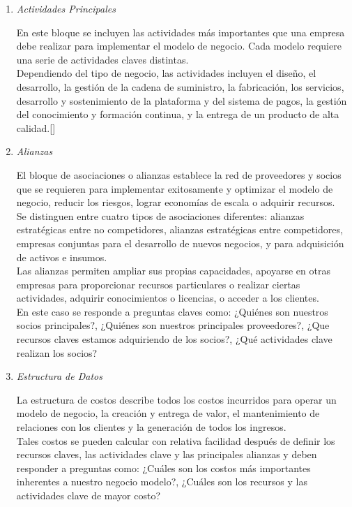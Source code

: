 \documentclass[10pt,a4paper]{article}
\begin{document}
\begin{multicols}{2}
\begin{enumerate}[1.]
			\item \textit{Actividades Principales}
			
			En este bloque se incluyen las actividades más importantes que una empresa debe realizar para implementar el modelo de negocio. Cada modelo requiere una serie de actividades claves distintas.\\
			
			Dependiendo del tipo de negocio, las actividades incluyen el diseño, el desarrollo, la gestión de la cadena de suministro, la fabricación, los servicios, desarrollo y sostenimiento de la plataforma y del sistema de pagos, la gestión del conocimiento y formación continua, y la entrega de un producto de alta calidad.[]
			
			\item \textit{Alianzas}
			
			El bloque de asociaciones o alianzas establece la red de proveedores y socios que se requieren para implementar exitosamente y optimizar el modelo de negocio, reducir los riesgos, lograr economías de escala o adquirir recursos.\\
			
			Se distinguen entre cuatro tipos de asociaciones diferentes: alianzas estratégicas entre no competidores, alianzas estratégicas entre competidores, empresas conjuntas para el desarrollo de nuevos negocios, y para adquisición de activos e insumos.\\
			
			Las alianzas permiten ampliar sus propias capacidades, apoyarse en otras empresas para proporcionar recursos particulares o realizar ciertas actividades, adquirir conocimientos o licencias, o acceder a los clientes.\\
			
			En este caso se responde a preguntas claves como: ¿Quiénes son nuestros socios principales?, ¿Quiénes son nuestros principales proveedores?, ¿Que recursos claves estamos adquiriendo de los socios?, ¿Qué actividades clave realizan los socios?
			
			\item \textit{Estructura de Datos}
			
			La estructura de costos describe todos los costos incurridos para operar un modelo de negocio, la creación y entrega de valor, el mantenimiento de relaciones con los clientes y la generación de todos los ingresos.\\
			
			Tales costos se pueden calcular con relativa facilidad después de definir los recursos claves, las actividades clave y las principales alianzas y deben responder a preguntas como: ¿Cuáles son los costos más importantes inherentes a nuestro negocio modelo?, ¿Cuáles son los recursos y las actividades clave de mayor costo?\\
			
			
		\end{enumerate}
		
		
			
			
			
		\end{multicols}	
			
\end{document}
